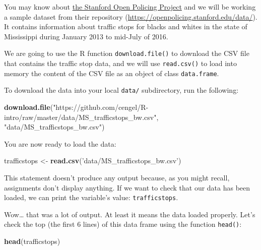 \documentclass[]{book}
\newenvironment{Shaded}{\begin{snugshade}}{\end{snugshade}}
\newcommand{\KeywordTok}[1]{\textcolor[rgb]{0.13,0.29,0.53}{\textbf{#1}}}
\newcommand{\StringTok}[1]{\textcolor[rgb]{0.31,0.60,0.02}{#1}}
\newcommand{\NormalTok}[1]{#1}
\theoremstyle{definition}
\theoremstyle{definition}
\theoremstyle{remark}
\begin{document}
You may know about \href{https://openpolicing.stanford.edu}{the Stanford
Open Policing Project} and we will be working a sample dataset from
their repository (\url{https://openpolicing.stanford.edu/data/}). It
contains information about traffic stops for blacks and whites in the
state of Mississippi during January 2013 to mid-July of 2016.

We are going to use the R function \texttt{download.file()} to download
the CSV file that contains the traffic stop data, and we will use
\texttt{read.csv()} to load into memory the content of the CSV file as
an object of class \texttt{data.frame}.

To download the data into your local \texttt{data/} subdirectory, run
the following:

\begin{Shaded}
\begin{Highlighting}[]
\KeywordTok{download.file}\NormalTok{(}\StringTok{"https://github.com/cengel/R-intro/raw/master/data/MS_trafficstops_bw.csv"}\NormalTok{,}
              \StringTok{"data/MS_trafficstops_bw.csv"}\NormalTok{)}
\end{Highlighting}
\end{Shaded}

You are now ready to load the data:

\begin{Shaded}
\begin{Highlighting}[]
\NormalTok{trafficstops <-}\StringTok{ }\KeywordTok{read.csv}\NormalTok{(}\StringTok{'data/MS_trafficstops_bw.csv'}\NormalTok{)}
\end{Highlighting}
\end{Shaded}

This statement doesn't produce any output because, as you might recall,
assignments don't display anything. If we want to check that our data
has been loaded, we can print the variable's value:
\texttt{trafficstops}.

Wow\ldots{} that was a lot of output. At least it means the data loaded
properly. Let's check the top (the first 6 lines) of this data frame
using the function \texttt{head()}:

\begin{Shaded}
\begin{Highlighting}[]
\KeywordTok{head}\NormalTok{(trafficstops)}
\end{Highlighting}
\end{Shaded}
\end{document}
